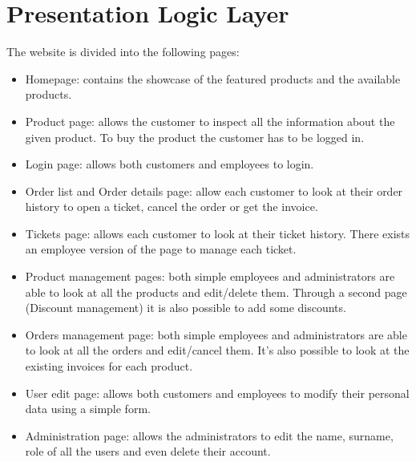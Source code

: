 \section{Presentation Logic Layer}


The website is divided into the following pages:
\begin{itemize}
    \item Homepage: contains the showcase of the featured products and the available products.
    \item Product page: allows the customer to inspect all the information about the given product. To buy the product the customer has to be logged in.
    \item Login page: allows both customers and employees to login. 
    \item Order list and Order details page: allow each customer to look at their order history to open a ticket, cancel the order or get the invoice.
    \item Tickets page: allows each customer to look at their ticket history. There exists an employee version of the page to manage each ticket.
    \item Product management pages: both simple employees and administrators are able to look at all the products and edit/delete them. Through a second page (Discount management) it is also possible to add some discounts.
    \item Orders management page: both simple employees and administrators are able to look at all the orders and edit/cancel them. It's also possible to look at the existing invoices for each product.
    \item User edit page: allows both customers and employees to modify their personal data using a simple form. 
    \item Administration page: allows the administrators to edit the name, surname, role of all the users and even delete their account.
\end{itemize}

